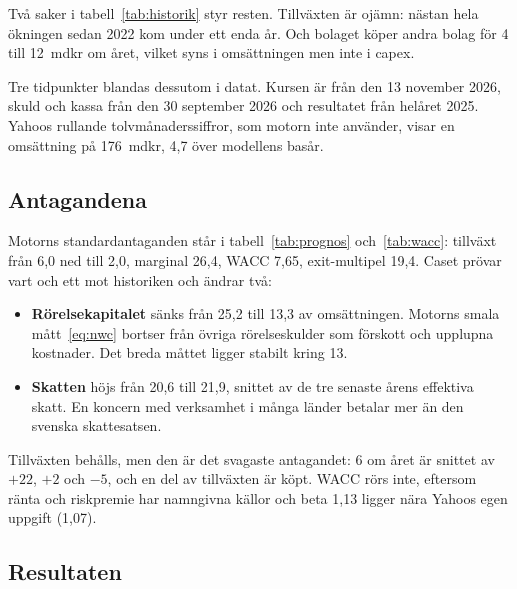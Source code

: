 Två saker i tabell~\ref{tab:historik} styr resten. Tillväxten är ojämn: nästan hela ökningen
sedan 2022 kom under ett enda år. Och bolaget köper andra bolag för 4 till 12~mdkr om året,
vilket syns i omsättningen men inte i capex.

Tre tidpunkter blandas dessutom i datat. Kursen är från den 13 november 2026, skuld och kassa
från den 30 september 2026 och resultatet från helåret 2025. Yahoos rullande
tolvmånaderssiffror, som motorn inte använder, visar en omsättning på 176~mdkr, 4,7\pct{} över
modellens basår.

\subsection{Antagandena}

Motorns standardantaganden står i tabell~\ref{tab:prognos} och~\ref{tab:wacc}: tillväxt från
6,0\pct{} ned till 2,0\pct, marginal 26,4\pct, WACC 7,65\pct, exit-multipel 19,4. Caset prövar
vart och ett mot historiken och ändrar två:

\begin{itemize}
  \item \textbf{Rörelsekapitalet} sänks från 25,2 till 13,3\pct{} av omsättningen. Motorns smala
    mått~\eqref{eq:nwc} bortser från övriga rörelseskulder som förskott och upplupna kostnader.
    Det breda måttet ligger stabilt kring 13\pct.
  \item \textbf{Skatten} höjs från 20,6 till 21,9\pct, snittet av de tre senaste årens effektiva
    skatt. En koncern med verksamhet i många länder betalar mer än den svenska skattesatsen.
\end{itemize}

Tillväxten behålls, men den är det svagaste antagandet: 6\pct{} om året är snittet av $+22$,
$+2$ och $-5$\pct, och en del av tillväxten är köpt. WACC rörs inte, eftersom ränta och
riskpremie har namngivna källor och beta 1,13 ligger nära Yahoos egen uppgift (1,07).

\subsection{Resultaten}

